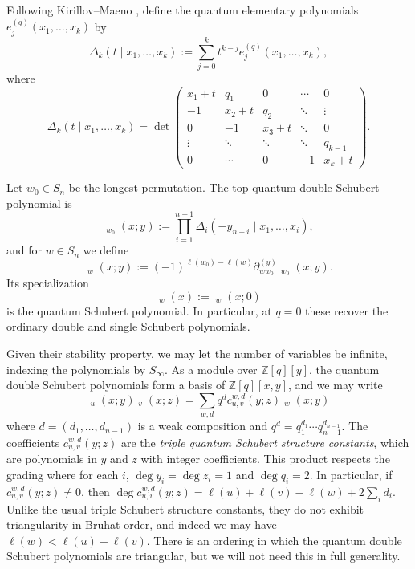 \documentclass{amsart}
\theoremstyle{definition}
\theoremstyle{remark}
\numberwithin{equation}{section}
\DeclareMathOperator{\qsch}{\widetilde{\mathfrak{S}}}
\begin{document}
Following Kirillov--Maeno \cite{kirillov2000quantum}, define the quantum elementary polynomials $e_j^{(q)}(x_1,\ldots,x_k)$ by
$$\Delta_k(t\mid x_1,\ldots,x_k):=\sum_{j=0}^k t^{k-j}e_j^{(q)}(x_1,\ldots,x_k),$$
where
$$\Delta_k(t\mid x_1,\ldots,x_k)=\det\!\begin{pmatrix}
x_1+t & q_1 & 0 & \cdots & 0\\
-1 & x_2+t & q_2 & \ddots & \vdots\\
0 & -1 & x_3+t & \ddots & 0\\
\vdots & \ddots & \ddots & \ddots & q_{k-1}\\
0 & \cdots & 0 & -1 & x_k+t
\end{pmatrix}.
$$

Let $w_0\in S_n$ be the longest permutation. The top quantum double Schubert polynomial is
$$\qsch_{w_0}(x;y):=\prod_{i=1}^{n-1}\Delta_i(-y_{n-i}\mid x_1,\ldots,x_i),$$
and for $w\in S_n$ we define
$$\qsch_w(x;y):=(-1)^{\ell(w_0) - \ell(w)}\partial_{ww_0}^{(y)}\qsch_{w_0}(x;y).$$
Its specialization
$$\qsch_w(x):=\qsch_w(x;0)$$
is the quantum Schubert polynomial. In particular, at $q=0$ these recover the ordinary double and single Schubert polynomials.

Given their stability property, we may let the number of variables be infinite, indexing the polynomials by $S_\infty$. As a module over $\mathbb{Z}[q][y]$, the quantum double Schubert polynomials form a basis of $\mathbb{Z}[q][x,y]$, and we may write
$$\qsch_u(x;y)\qsch_v(x;z)=\sum_{w,d}q^dc_{u,v}^{w,d}(y;z)\qsch_w(x;y)$$
where $d=(d_1,\ldots,d_{n-1})$ is a weak composition and $q^d=q_1^{d_1}\cdots q_{n-1}^{d_{n-1}}$. The coefficients $c_{u,v}^{w,d}(y;z)$ are the \emph{triple quantum Schubert structure constants}, which are polynomials in $y$ and $z$ with integer coefficients. This product respects the grading where for each $i$, $\deg y_i=\deg z_i=1$ and $\deg q_i=2$. In particular, if $c_{u,v}^{w,d}(y;z)\neq 0$, then $\deg c_{u,v}^{w,d}(y;z)=\ell(u)+\ell(v)-\ell(w)+2\sum_i d_i$. Unlike the usual triple Schubert structure constants, they do not exhibit triangularity in Bruhat order, and indeed we may have $\ell(w) < \ell(u) + \ell(v)$. There is an ordering in which the quantum double Schubert polynomials are triangular, but we will not need this in full generality.
\end{document}
